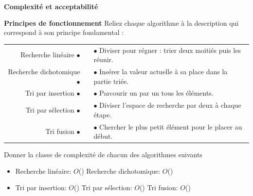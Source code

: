 \documentclass[a4paper, noanswers, addpoints, 12pt]{exam}
\begin{document}
\begin{questions}

\question \textbf{Complexité et acceptabilité}

\question[2\half] \textbf{Principes de fonctionnement} 
Reliez chaque algorithme à la description qui correspond à son principe fondamental :
\begin{center}
\begin{tabular}{r c l}
Recherche linéaire $\bullet$ & & $\bullet$ Diviser pour régner : trier deux moitiés puis les réunir. \\
Recherche dichotomique $\bullet$ & & $\bullet$ Insérer la valeur actuelle à sa place dans la partie triée. \\
Tri par insertion $\bullet$ & & $\bullet$ Parcourir un par un tous les éléments. \\
Tri par sélection $\bullet$ & & $\bullet$ Diviser l'espace de recherche par deux à chaque étape. \\
Tri fusion $\bullet$ & & $\bullet$ Chercher le plus petit élément pour le placer au début. \\
\end{tabular}
\end{center}

\question[2\half] Donner la classe de complexité de chacun des algorithmes suivants \\
\begin{itemize}
    \item Recherche linéaire: $O$(\dotfill) Recherche dichotomique: $O$(\dotfill)
    \item Tri par insertion: $O$(\dotfill) Tri par sélection: $O$(\dotfill) Tri fusion: $O$(\dotfill)
\end{itemize}


\end{questions}
\end{document}
